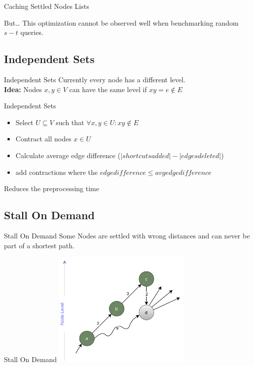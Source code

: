 \documentclass[8pt, t, aspectratio=169]{beamer}
\begin{document}
\begin{huge}
\begin{frame}{Caching Settled Nodes Lists}
  \pause

  \vfill
  \begin{block}{But\dots}
    This optimization cannot be observed well when benchmarking random $s-t$ queries.
  \end{block}
    
  \vfill

\end{frame}

\subsection{Independent Sets}
\begin{frame}{Independent Sets}
  \vfill
  Currently every node has a different level.\\
  \pause
  \textbf{Idea:} Nodes $x,y \in V$ can have the same level if $xy = e \notin E$
  \vfill

\end{frame}

\begin{frame}{Independent Sets}
  \vfill

  \begin{itemize}
    \pause
  \item Select $U \subseteq V$ such that $\forall x,y \in U: xy \notin E$
    \pause
  \item Contract all nodes $x \in U$
    \pause
  \item Calculate average edge difference ($|shortcuts added| - |edges deleted|$)
    \pause
  \item add contractions where the $edge difference \leq avg edge difference$
  \end{itemize}

  \pause

  \Rightarrow Reduces the preprocessing time

  \vfill

\end{frame}

\subsection{Stall On Demand}
\begin{frame}{Stall On Demand}
  \vfill
  Some Nodes are settled with wrong distances and can never be part of a shortest path.
  \vfill
\end{frame}
\begin{frame}{Stall On Demand}
  \vfill
  \centering
  \includegraphics[width=0.5\textwidth]{sod.pdf}
  \vfill
\end{frame}


\end{huge}
\end{document}
